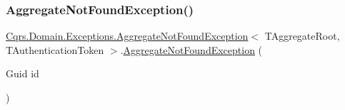 \subsubsection{\texorpdfstring{Aggregate\+Not\+Found\+Exception()}{AggregateNotFoundException()}}
{\footnotesize\ttfamily \hyperlink{classCqrs_1_1Domain_1_1Exceptions_1_1AggregateNotFoundException}{Cqrs.\+Domain.\+Exceptions.\+Aggregate\+Not\+Found\+Exception}$<$ T\+Aggregate\+Root, T\+Authentication\+Token $>$.\hyperlink{classCqrs_1_1Domain_1_1Exceptions_1_1AggregateNotFoundException}{Aggregate\+Not\+Found\+Exception} (\begin{DoxyParamCaption}\item[{Guid}]{id }\end{DoxyParamCaption})}

